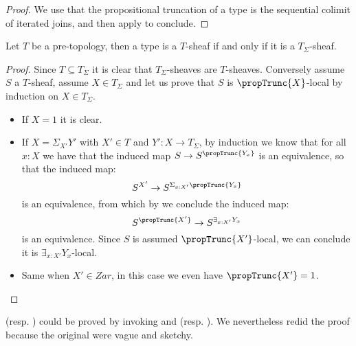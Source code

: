 \begin{proof}
We use that the propositional truncation of a type is the sequential colimit of iterated joins, and then apply  to conclude.
\end{proof}

\begin{lemma}\label{Tsigma-sheaf-generated}
Let $T$ be a pre-topology, then a type is a $T$-sheaf if and only if it is a $T_\Sigma$-sheaf.
\end{lemma}

\begin{proof}
Since $T\subseteq T_\Sigma$ it is clear that $T_\Sigma$-sheaves are $T$-sheaves. Conversely assume $S$ a $T$-sheaf, assume $X\in T_\Sigma$ and let us prove that $S$ is $\propTrunc{X}$-local by induction on $X\in T_\Sigma$.
\begin{itemize}
\item If $X=1$ it is clear.
\item If $X=\Sigma_{X'}Y'$ with $X'\in T$ and $Y':X\to T_\Sigma$, by induction we know that for all $x:X$ we have that the induced map $S\to S^{\propTrunc{Y_x}}$ is an equivalence, so that the induced map:
\[S^{X'}\to S^{\Sigma_{x:X'}\propTrunc{Y_x}}\] 
is an equivalence, from which by  we conclude the induced map:
\[S^{\propTrunc{X'}}\to S^{\exists_{x:X'}Y_x}\]
is an equivalence. Since $S$ is assumed $\propTrunc{X'}$-local, we can conclude it is $\exists_{x:X'}Y_x$-local. %
\item Same when $X'\in Zar$, in this case we even have $\propTrunc{X'}=1$.
\end{itemize}
\end{proof}

\begin{remark}
 (resp. ) could be proved by invoking  and  (resp. ). We nevertheless redid the proof because the original were vague and sketchy.
\end{remark}




